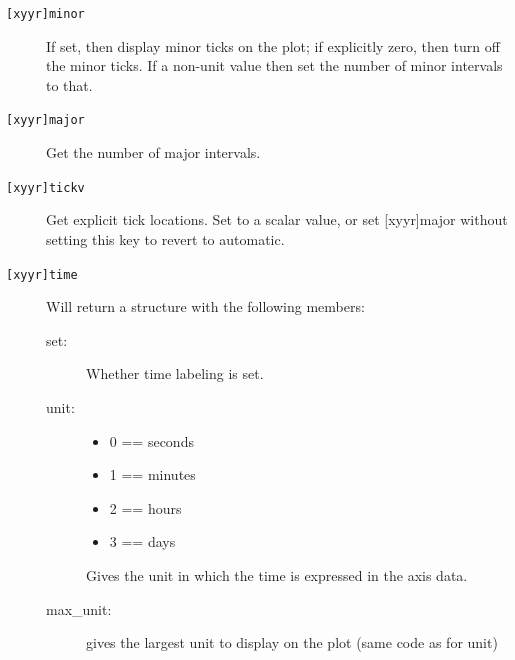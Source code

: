 \documentclass[11pt,twoside,english]{article}
\begin{document}
\begin{description}
     \item[\texttt{[xyyr]minor}]	If set, then display minor ticks on
       the plot; if explicitly zero, then
       turn off the minor ticks. If a
       non-unit value then set the number of
       minor intervals to that.
     \item[\texttt{[xyyr]major}]	Get the number of major intervals.
     \item[\texttt{[xyyr]tickv}]	Get explicit tick locations. Set to a
       scalar value, or set [xyyr]major without
       setting this key to revert to automatic.
     \item[\texttt{[xyyr]time}]	Will return a 
       structure with the following members:
       \begin{description}
       \item[set:] Whether time labeling is set.

       \item [unit:] 
         \begin{itemize}
         \item 0 == seconds
         \item 1 == minutes
         \item 2 == hours
         \item 3 == days
         \end{itemize}
       Gives the unit in which the
       time is expressed in the axis data.

     \item [max\_unit:] gives the largest unit to
       display on the plot (same code as
       for unit)


\end{description}
\end{description}
\end{document}
